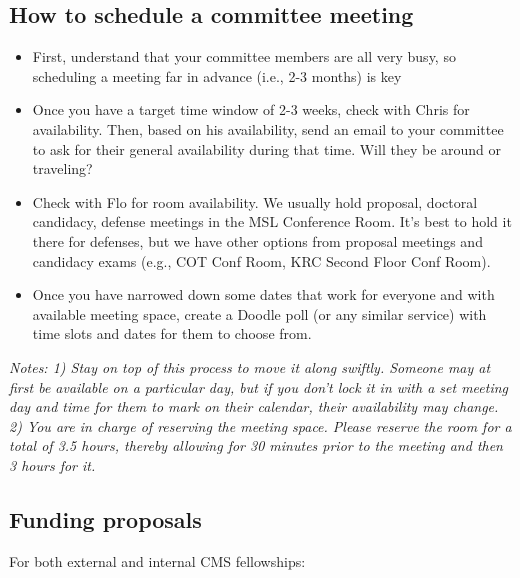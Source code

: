 \documentclass[
]{article}
\providecommand{\tightlist}{%
  \setlength{\itemsep}{0pt}\setlength{\parskip}{0pt}}
\begin{document}
\hypertarget{how-to-schedule-a-committee-meeting}{%
\subsection{How to schedule a committee meeting}\label{how-to-schedule-a-committee-meeting}}

\begin{itemize}
\tightlist
\item
  First, understand that your committee members are all very busy, so scheduling a meeting far in advance (i.e., 2-3 months) is key
\item
  Once you have a target time window of 2-3 weeks, check with Chris for availability. Then, based on his availability, send an email to your committee to ask for their general availability during that time. Will they be around or traveling?
\item
  Check with Flo for room availability. We usually hold proposal, doctoral candidacy, defense meetings in the MSL Conference Room. It's best to hold it there for defenses, but we have other options from proposal meetings and candidacy exams (e.g., COT Conf Room, KRC Second Floor Conf Room).
\item
  Once you have narrowed down some dates that work for everyone and with available meeting space, create a Doodle poll (or any similar service) with time slots and dates for them to choose from.
\end{itemize}

\emph{Notes: 1) Stay on top of this process to move it along swiftly. Someone may at first be available on a particular day, but if you don't lock it in with a set meeting day and time for them to mark on their calendar, their availability may change. 2) You are in charge of reserving the meeting space. Please reserve the room for a total of 3.5 hours, thereby allowing for 30 minutes prior to the meeting and then 3 hours for it.}

\hypertarget{funding-proposals}{%
\subsection{Funding proposals}\label{funding-proposals}}

For both external and internal CMS fellowships:
\end{document}
